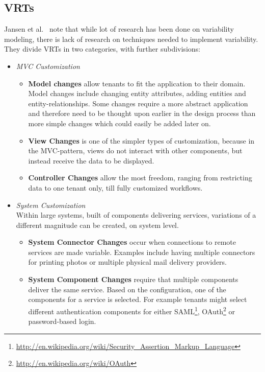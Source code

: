 \subsection{\aclp{VRT}}
\label{sec:vrt}
Jansen et al.~\cite{jansen2010customization} note that while lot of research has been done on variability modeling, there is lack of research on techniques needed to implement variability. They divide \acp{VRT} in two categories, with further subdivisions:
\begin{itemize}
\item \textit{\ac{MVC} Customization}
\begin{itemize}
\item \textbf{Model changes} allow tenants to fit the application to their domain. Model changes include changing entity attributes, adding entities and entity-relationships. Some changes require a more abstract application and therefore need to be thought upon earlier in the design process than more simple changes which could easily be added later on.
\item \textbf{View Changes} is one of the simpler types of customization, because in the \ac{MVC}-pattern, views do not interact with other components, but instead receive the data to be displayed.
\item \textbf{Controller Changes} allow the most freedom, ranging from restricting data to one tenant only, till fully customized workflows.
\end{itemize}
\item \textit{System Customization} \\ Within large systems, built of components delivering services, variations of a different magnitude can be created, on system level.
\begin{itemize}
\item \textbf{System Connector Changes} occur when connections to remote services are made variable. Examples include having multiple connectors for printing photos or multiple physical mail delivery providers.
\item \textbf{System Component Changes} require that multiple components deliver the same service. Based on the configuration, one of the components for a service is selected. For example tenants might select different authentication components for either SAML\footnote{\url{http://en.wikipedia.org/wiki/Security_Assertion_Markup_Language}}, OAuth\footnote{\url{http://en.wikipedia.org/wiki/OAuth}} or password-based login.
\end{itemize}
\end{itemize}

